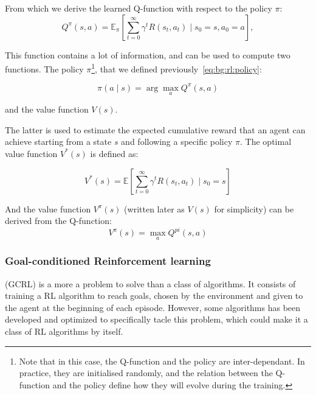 From which we derive the learned Q-function with respect to the policy $\pi$:
\begin{equation} \label{eq:bg:rl:q_function_wrt_pi}
    Q^{\pi}(s, a) = \mathbb{E}_\pi \left[ \sum_{t=0}^\infty \gamma^t R(s_t, a_t) \mid s_0 = s, a_0 = a \right],
\end{equation}

This function contains a lot of information, and can be used to compute two functions.
The policy $\pi$\footnote{Note that in this case, the Q-function and the policy are inter-dependant.
In practice, they are initialised randomly, and the relation between the Q-function and the policy define how they will
evolve during the training.}, that we defined previously~\ref{eq:bg:rl:policy}:

\begin{equation} \label{eq:bg:rl:pi_from_q_function}
    \pi(a \mid s) = \arg\max_a Q^{\pi}(s, a)
\end{equation}

and the value function $V(s)$.

The latter is used to estimate the expected cumulative reward that an agent can achieve starting from a state $s$ and
following a specific policy $\pi$.
The optimal value function $V^*(s)$ is defined as:

\begin{equation} \label{eq:bg:rl:optimal_value_function}
    V^*(s) = \mathbb{E} \left[ \sum_{t=0}^\infty \gamma^t R(s_t, a_t) \mid s_0 = s \right]
\end{equation}

And the value function $V^{\pi}(s)$ (written later as $V(s)$ for simplicity) can be derived from the Q-function:
\begin{equation} \label{eq:bg:rl:value_function}
    V^{\pi}(s) = \max_a Q^{pi}(s, a)
\end{equation}

\subsubsection{Goal-conditioned Reinforcement learning}

 (GCRL) is a more a problem to solve than a class of algorithms.
It consists of training a RL algorithm to reach goals, chosen by the environment and given to the agent at the
beginning of each episode.
However, some algorithms has been developed and optimized to specifically tacle this problem, which could make it a
class of RL algorithms by itself.

